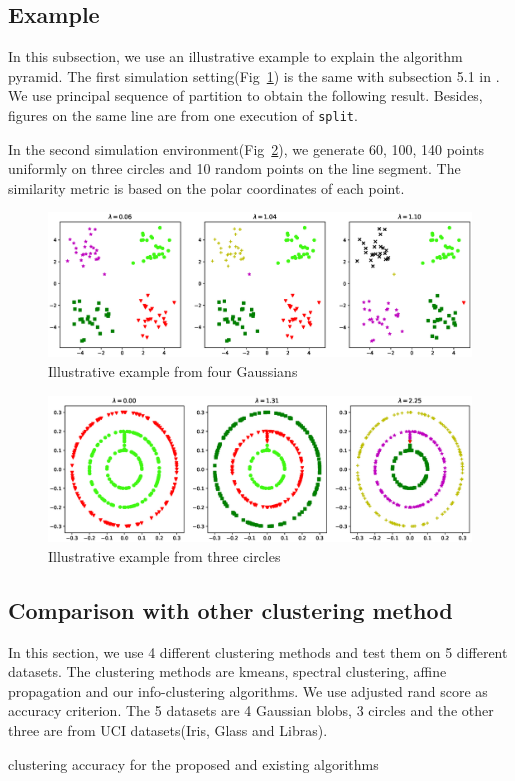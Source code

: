 \documentclass{article}
\begin{document}
\subsection{Example}

In this subsection, we use an illustrative example to explain the algorithm pyramid.
The first simulation setting(Fig~\ref{fig:4p}) is the same with subsection 5.1 in \cite{mac}.  We use principal sequence of partition to obtain the following result.
Besides, figures on the same line are from one execution of \texttt{split}.

In the second simulation environment(Fig~\ref{fig:3c}), we generate 60, 100, 140 points uniformly on three circles and 10 random points on the line segment. The similarity metric is based on the polar coordinates of each point.

\begin{figure}[!ht]
\includegraphics[width=12cm]{pic/4part.eps}
\caption{Illustrative example from four Gaussians}\label{fig:4p}
\end{figure}

\begin{figure}[!ht]
\includegraphics[width=12cm]{pic/3circle.eps}
\caption{Illustrative example from three circles}\label{fig:3c}
\end{figure}
\subsection{Comparison with other clustering method}
In this section, we use 4 different clustering methods and test them on 5 different datasets. The clustering methods are kmeans, spectral clustering, affine propagation and our info-clustering algorithms. We use adjusted rand score as accuracy criterion. The 5 datasets are 4 Gaussian blobs, 3 circles and the other three are from UCI datasets(Iris, Glass and Libras).
\begin{table}[!ht]
\centering
{}
\caption{clustering accuracy for the proposed and existing algorithms}
\end{table}
\end{document}

